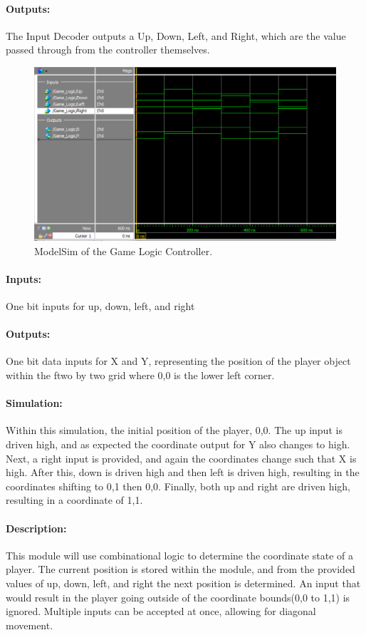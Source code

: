 \documentclass[]{article}
\begin{document}
\paragraph{Outputs:} The Input Decoder outputs a Up, Down, Left, and Right, which are the value passed through from the controller themselves.
\begin{figure}[H]\centering
	\includegraphics[width=\linewidth]{figures/Game_Logic_ModelSim.png}
    \caption{ModelSim of the Game Logic Controller.}
\end{figure}
\paragraph{Inputs:} One bit inputs for up, down, left, and right
\paragraph{Outputs:} One bit data inputs for X and Y, representing the position of the player object within the ftwo by two grid where 0,0 is the lower left corner.
\paragraph{Simulation:} Within this simulation, the initial position of the player, 0,0. The up input is driven high, and as expected the coordinate output for Y also changes to high.
Next, a right input is provided, and again the coordinates change such that X is high. After this, down is driven high and then left is driven high,
resulting in the coordinates shifting to 0,1 then 0,0. Finally, both up and right are driven high, resulting in a coordinate of 1,1.
\paragraph{Description:} This module will use combinational logic to determine the coordinate state of a player.
The current position is stored within the module, and from the provided values of up, down, left, and right the next position is determined.
An input that would result in the player going outside of the coordinate bounds(0,0 to 1,1) is ignored. Multiple inputs can be accepted at once, allowing for diagonal movement.
\end{document}
